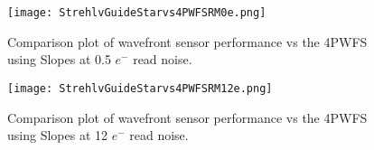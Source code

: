 \begin{figure}[h]
    \centering
    \texttt{[image: StrehlvGuideStarvs4PWFSRM0e.png]}
    \caption{Comparison plot of wavefront sensor performance vs the 4PWFS using Slopes at 0.5 $e^-$ read noise. }
    \label{fig:0RN}
\end{figure}

\begin{figure}[h]
    \centering
    \texttt{[image: StrehlvGuideStarvs4PWFSRM12e.png]}
    \caption{Comparison plot of wavefront sensor performance vs the 4PWFS using Slopes at 12 $e^-$ read noise.}
    \label{fig:12RN}
\end{figure}

\newpage